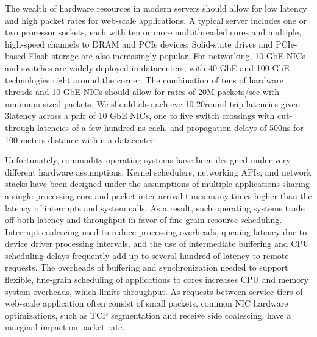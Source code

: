 The wealth of hardware resources in modern servers should allow for
low latency and high packet rates for web-scale applications.  A
typical server includes one or two processor sockets, each with ten or
more multithreaded cores and multiple, high-speed channels to DRAM and
PCIe devices. Solid-state drives and PCIe-based Flash storage are also
increasingly popular. For networking, 10 GbE NICs and switches are
widely deployed in datacenters, with 40 GbE and 100 GbE technologies
right around the corner. The combination of tens of hardware threads
and 10 GbE NICs should allow for rates of 20M packets/sec with minimum
sized packets.  We should also achieve 10-20\microsecond round-trip
latencies given 3\microsecond latency across a pair of 10 GbE NICs,
one to five switch crossings with cut-through latencies of a few
hundred ns each, and propagation delays of 500ns for 100 meters
distance within a datacenter.


Unfortunately, commodity operating systems have been designed under
very different hardware assumptions. Kernel schedulers, networking
APIs, and network stacks have been designed under the assumptions of
multiple applications sharing a single processing core and packet
inter-arrival times many times higher than the latency of interrupts
and system calls.  As a result, such operating systems trade off both
latency and throughput in favor of fine-grain resource scheduling.
Interrupt coalescing used to reduce processing overheads, queuing
latency due to device driver processing intervals, and the use of
intermediate buffering and CPU scheduling delays frequently add up to
several hundred \microsecond of latency to remote requests.  The
overheads of buffering and synchronization needed to support flexible,
fine-grain scheduling of applications to cores increases CPU and
memory system overheads, which limits throughput.  As requests between
service tiers of web-scale application often consist of small packets,
common NIC hardware optimizations, such as TCP segmentation and
receive side coalescing, have a marginal impact on packet rate.



